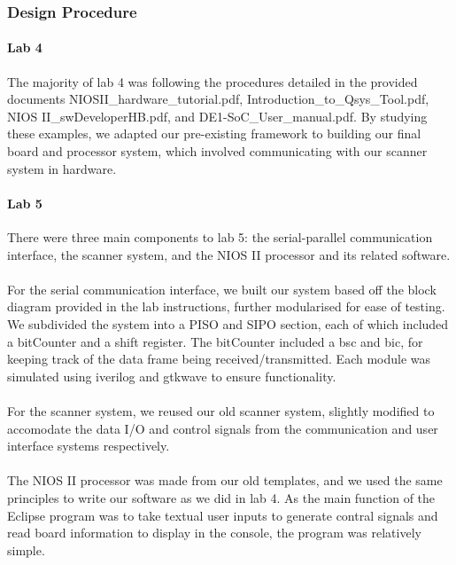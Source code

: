 \documentclass{article}
\begin{document}
    \subsubsection{Design Procedure}
    \paragraph{Lab 4} The majority of lab 4 was following the procedures detailed in the provided documents NIOSII\_hardware\_tutorial.pdf, Introduction\_to\_Qsys\_Tool.pdf, NIOS II\_swDeveloperHB.pdf, and DE1-SoC\_User\_manual.pdf. By studying these examples, we adapted our pre-existing framework to building our final board and processor system, which involved communicating with our scanner system in hardware.

    \paragraph{Lab 5} There were three main components to lab 5: the serial-parallel communication interface, the scanner system, and the NIOS II processor and its related software.
    \paragraph{} For the serial communication interface, we built our system based off the block diagram provided in the lab instructions, further modularised for ease of testing. We subdivided the system into a PISO and SIPO section, each of which included a bitCounter and a shift register. The bitCounter included a bsc and bic, for keeping track of the data frame being received/transmitted. Each module was simulated using iverilog and gtkwave to ensure functionality.
    \paragraph{} For the scanner system, we reused our old scanner system, slightly modified to accomodate the data I/O and control signals from the communication and user interface systems respectively.
    \paragraph{} The NIOS II processor was made from our old templates, and we used the same principles to write our software as we did in lab 4. As the main function of the Eclipse program was to take textual user inputs to generate contral signals and read board information to display in the console, the program was relatively simple.
\end{document}
